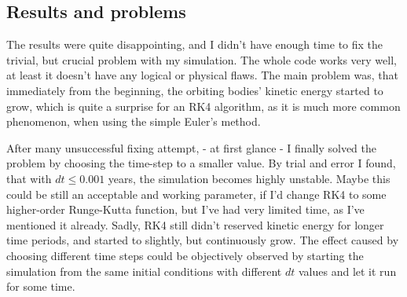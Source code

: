 \begin{multicols}{2}
\section{Results and problems}
The results were quite disappointing, and I didn't have enough time to fix the trivial, but crucial problem with my simulation. The whole code works very well, at least it doesn't have any logical or physical flaws. The main problem was, that immediately from the beginning, the orbiting bodies' kinetic energy started to grow, which is quite a surprise for an RK4 algorithm, as it is much more common phenomenon, when using the simple Euler's method. \par
After many unsuccessful fixing attempt, - at first glance - I finally solved the problem by choosing the time-step to a smaller value. By trial and error I found, that with $dt \leq 0.001$ years, the simulation becomes highly unstable. Maybe this could be still an acceptable and working parameter, if I'd change RK4 to some higher-order Runge-Kutta function, but I've had very limited time, as I've mentioned it already. Sadly, RK4 still didn't reserved kinetic energy for longer time periods, and started to slightly, but continuously grow. The effect caused by choosing different time steps could be objectively observed by starting the simulation from the same initial conditions with different $dt$ values and let it run for some time.


\end{multicols}
